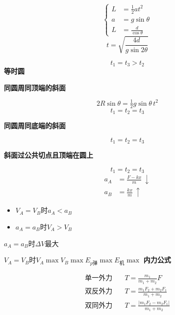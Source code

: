 \[
\left\{\begin{aligned}
L&=\tfrac{1}{2}at^{2}\\
a&=g\sin\theta\\
L&=\frac{d}{\cos\theta}
\end{aligned}\right.
\]
\[
t=\sqrt{\frac{4d}{g\sin 2\theta}}
\]


\[
t_1=t_3>t_2
\]
\textbf{等时圆}

\textbf{同圆周同顶端的斜面}


\[
2R\sin\theta=\tfrac{1}{2}g\sin\theta\,t^{2}
\]
\[
t_1=t_2=t_3
\]

\textbf{同圆周同底端的斜面}


\[
t_1=t_2=t_3
\]

\textbf{斜面过公共切点且顶端在圆上}


\[
t_1=t_2=t_3
\]
\begin{align*}
a_A&=\frac{F-kx}{m}\ \downarrow\\
a_B&=\frac{kx}{m}\ \uparrow
\end{align*}
\begin{itemize}
\item $V_A=V_B$时\quad $a_A<a_B$
\item $a_A=a_B$时\quad $V_A>V_B$
\end{itemize}

$a_A=a_B$时\quad $\Delta V$最大

$V_A=V_B$时\quad $V_A\max$\quad $V_B\max$\quad $E_{p\text{弹}}\max$\quad $E_{\text{机}}\max$ %
\textbf{内力公式}

\begin{align*}
\text{单一外力}\quad&T=\frac{m_1}{m_1+m_2}F\\[6pt]
\text{双反外力}\quad&T=\frac{m_1F_2+m_2F_1}{m_1+m_2}\\[6pt]
\text{双同外力}\quad&T=\frac{|m_1F_2-m_2F_1|}{m_1+m_2}
\end{align*}

